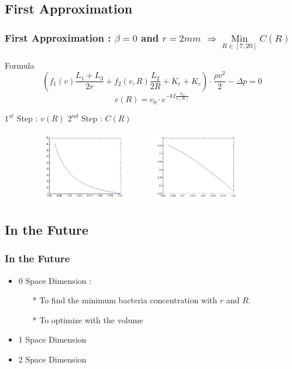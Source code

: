 \documentclass[xcolor=dvipsnames,10pt]{beamer}
\begin{document}
\subsection{First Approximation}
\begin{frame}
\frametitle{First Approximation : $\beta = 0$ and $r=2mm$ $\Rightarrow \mathop{Min}\limits _{R\in [7,20]} C(R)$}
\begin{block}{Formula}
\begin{equation}
\left(f_1(v)\frac{L_1+L_3}{2r} + f_2(v,R)\frac{L_2}{2R} + K_e + K_c\right)\cdot \frac{\rho v^2}{2} - \Delta p = 0
\end{equation}
\begin{equation}
c(R) = c_0\cdot e^{-kI\frac{L_2}{v(R)}}
\end{equation}
\end{block}
$1^{st}$ Step : $v(R)$ \hspace{40mm} $2^{nd}$ Step : $C(R)$
	\begin{figure}
	\raggedleft
	\includegraphics[height=3.1cm, width=5cm]{./images/graphVR.jpg}
	\hspace{5mm}
	\raggedright
	\includegraphics[height=3.1cm, width=5cm]{./images/graphCR.jpg}
	\end{figure}
\end{frame}

\subsection{In the Future}
\begin{frame}
\frametitle{In the Future}
\begin{itemize}
\item 0 Space Dimension :
	\begin{itemize} 
		\item[*] To find the minimum bacteria concentration with $r$ and $R$.
		\item[*] To optimize with the volume
	\end{itemize}
\vspace{1cm}
\item 1 Space Dimension
\vspace{1cm}
\item 2 Space Dimension

\end{itemize}
\end{frame}
\end{document}

